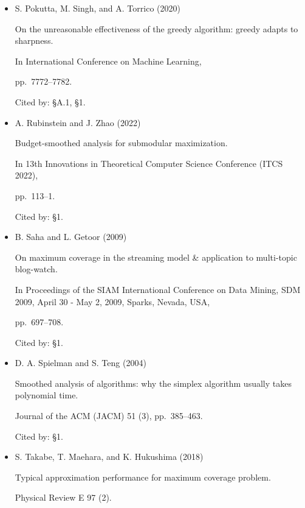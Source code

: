 \documentclass[10pt,a4paper]{article}
\begin{document}
\begin{itemize}
Sudden emergence of a giantk-core in a random graph.

Journal of Combinatorial Theory, Series B 67 (1), pp. 111–151.

Cited by: §3.1.



\item[] [24]
S. Pokutta, M. Singh, and A. Torrico (2020)

On the unreasonable effectiveness of the greedy algorithm: greedy adapts to sharpness.

In International Conference on Machine Learning,

pp. 7772–7782.

Cited by: §A.1,
§1.



\item[] [25]
A. Rubinstein and J. Zhao (2022)

Budget-smoothed analysis for submodular maximization.

In 13th Innovations in Theoretical Computer Science Conference (ITCS 2022),

pp. 113–1.

Cited by: §1.



\item[] [26]
B. Saha and L. Getoor (2009)

On maximum coverage in the streaming model \& application to multi-topic blog-watch.

In Proceedings of the SIAM International Conference on Data Mining,
SDM 2009, April 30 - May 2, 2009, Sparks, Nevada, USA,

pp. 697–708.

Cited by: §1.



\item[] [27]
D. A. Spielman and S. Teng (2004)

Smoothed analysis of algorithms: why the simplex algorithm usually takes polynomial time.

Journal of the ACM (JACM) 51 (3), pp. 385–463.

Cited by: §1.



\item[] [28]
S. Takabe, T. Maehara, and K. Hukushima (2018)

Typical approximation performance for maximum coverage problem.

Physical Review E 97 (2).


\end{itemize}
\end{document}
